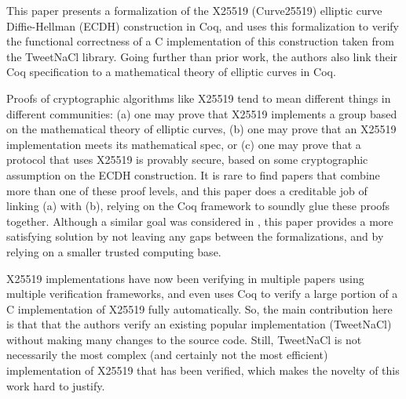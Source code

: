 \begin{center}
\end{center}

This paper presents a formalization of the X25519 (Curve25519) elliptic curve
Diffie-Hellman  (ECDH) construction in Coq, and uses this formalization to
verify the functional correctness of a C implementation of this construction
taken from the TweetNaCl library. Going further than prior work, the authors
also link their Coq specification to a mathematical theory of elliptic curves
in Coq.


\begin{center}
\end{center}

Proofs of cryptographic algorithms like X25519 tend to mean different things in
different communities: (a) one may prove that X25519 implements a group based on
the mathematical theory of elliptic curves, (b) one may prove that an X25519
implementation meets its mathematical spec, or (c) one may prove that a protocol
that uses X25519 is provably secure, based on some cryptographic assumption on
the ECDH construction. It is rare to find papers that combine more than one of
these proof levels, and this paper does a creditable job of linking (a) with (b),
relying on the Coq framework to soundly glue these proofs together. Although a
similar goal was considered in \cite{Zinzindohoue2016AVE}, this paper provides
a more satisfying solution by not leaving any gaps between the formalizations,
and by relying on a smaller trusted computing base.


\begin{center}
\end{center}

X25519 implementations have now been verifying in multiple papers using multiple
verification frameworks, and \cite{Erbsen2016SystematicSO} even uses Coq to
verify a large portion of a C implementation of X25519 fully automatically.
So, the main contribution here is that that the authors verify an existing
popular implementation (TweetNaCl) without making many changes to the source
code. Still, TweetNaCl is not necessarily the most complex (and certainly not
the most efficient) implementation of X25519 that has been verified, which
makes the novelty of this work hard to justify.


\begin{center}
\end{center}

